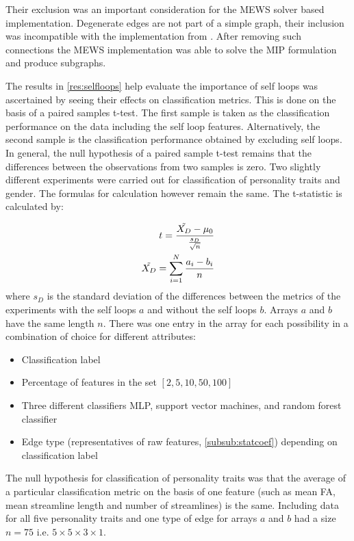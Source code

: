 \documentclass[msthesis.tex]{subfiles}
\begin{document}
Their exclusion was an important consideration for the MEWS solver based implementation. Degenerate edges are not part of a simple graph, their inclusion was incompatible with the implementation from \cite{DBLP:journals/corr/LobodaAS16}. After removing such connections the MEWS implementation was able to solve the MIP formulation and produce subgraphs.

The results in \autoref{res:selfloops} help evaluate the importance of self loops was ascertained by seeing their effects on classification metrics. This is done on the basis of a paired samples t-test. The first sample is taken as the classification performance on the  data including the self loop features. Alternatively, the second sample is the classification performance obtained by excluding self loops. In general, the null hypothesis of a paired sample t-test remains that the differences between the observations from two samples is zero. Two slightly different experiments were carried out for classification of personality traits and gender. The formulas for calculation however remain the same. The t-statistic is calculated by:

\begin{align}
    \label{eq:pairedtest}
    t = \frac{\Tilde{X_{D}} - \mu_0}{\frac{s_{D}}{\sqrt{n}}} \\
    \Tilde{X_D} = \sum_{i=1}^{N} \frac{a_{i} - b_{i}}{n}
\end{align}where $s_D$ is the standard deviation of the differences between the metrics of the experiments with the self loops $a$ and without the self loops $b$. Arrays $a$ and $b$ have the same length $n$. There was one entry in the array for each possibility in a combination of choice for different attributes:
\begin{itemize}
    \item Classification label
    \item Percentage of features in the set $[2,5,10,50,100]$
    \item Three different classifiers MLP, support vector machines, and random forest classifier 
    \item Edge type (representatives of raw features, \autoref{subsub:statcoef}) depending on classification label
\end{itemize}

The null hypothesis for classification of personality traits was that the average of a particular classification metric on the basis of one feature (such as mean FA, mean streamline length and number of streamlines) is the same. Including data for all five personality traits and one type of edge for arrays $a$ and $b$ had a size  $n=75$ i.e. $5\times 5 \times 3 \times 1$. 
\end{document}
